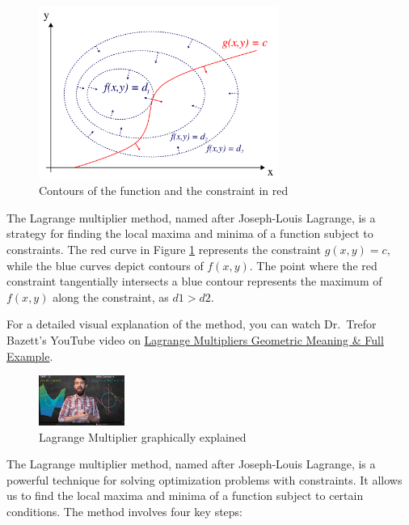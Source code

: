 \documentclass[
  12pt,
  oneside]{book}
\theoremstyle{definition}
\theoremstyle{definition}
\theoremstyle{definition}
\theoremstyle{definition}
\theoremstyle{remark}
\begin{document}
\begin{figure}
\centering
\includegraphics[width=0.7\textwidth,height=\textheight]{fig/lagr2.png}
\caption{\label{fig:lagr2} Contours of the function and the constraint in red}
\end{figure}

The Lagrange multiplier method, named after Joseph-Louis Lagrange,
is a strategy for finding the local maxima and minima of a function subject to constraints.
The red curve in Figure \ref{fig:lagr2} represents the constraint \(g(x, y) = c\),
while the blue curves depict contours of \(f(x, y)\).
The point where the red constraint tangentially intersects a blue contour
represents the maximum of \(f(x, y)\) along the constraint, as \(d1 > d2\).

For a detailed visual explanation of the method, you can watch Dr.~Trefor Bazett's
YouTube video on \href{https://youtu.be/8mjcnxGMwFo}{Lagrange Multipliers \textbar{} Geometric Meaning \& Full Example}.

\begin{figure}
\centering
\includegraphics[width=0.25\textwidth,height=\textheight]{fig/lagrange-yt.png}
\caption[\label{fig:lagrange-yt} Lagrange Multiplier graphically explained]{\label{fig:lagrange-yt} Lagrange Multiplier graphically explained\footnotemark{}}
\end{figure}

The Lagrange multiplier method, named after Joseph-Louis Lagrange,
is a powerful technique for solving optimization problems with constraints.
It allows us to find the local maxima and minima of a function subject to certain conditions.
The method involves four key steps:
\end{document}
